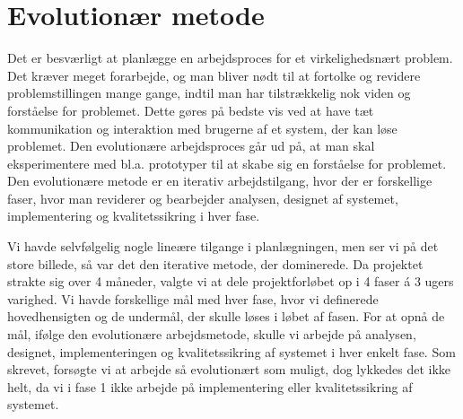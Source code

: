 \section{Evolutionær metode}
\label{sec:evolution}

Det er besværligt at planlægge en arbejdsproces for et virkelighedsnært problem. Det kræver meget forarbejde, og man bliver nødt til at fortolke og revidere problemstillingen mange gange, indtil man har tilstrækkelig nok viden og forståelse for problemet. Dette gøres på bedste vis ved at have tæt kommunikation og interaktion med brugerne af et system, der kan løse problemet. Den evolutionære arbejdsproces går ud på, at man skal eksperimentere med bl.a. prototyper til at skabe sig en forståelse for problemet. \cite{cic} Den evolutionære metode er en iterativ arbejdstilgang, hvor der er forskellige faser, hvor man reviderer og bearbejder analysen, designet af systemet, implementering og kvalitetssikring i hver fase.

Vi havde selvfølgelig nogle lineære tilgange i planlægningen, men ser vi på det store billede, så var det den iterative metode, der dominerede. Da projektet strakte sig over 4 måneder, valgte vi at dele projektforløbet op i 4 faser á 3 ugers varighed. Vi havde forskellige mål med hver fase, hvor vi definerede hovedhensigten og de undermål, der skulle løses i løbet af fasen. For at opnå de mål, ifølge den evolutionære arbejdsmetode, skulle vi arbejde på analysen, designet, implementeringen og kvalitetssikring af systemet i hver enkelt fase. Som skrevet, forsøgte vi at arbejde så evolutionært som muligt, dog lykkedes det ikke helt, da vi \fx i fase 1 ikke arbejde på implementering eller kvalitetssikring af systemet.

